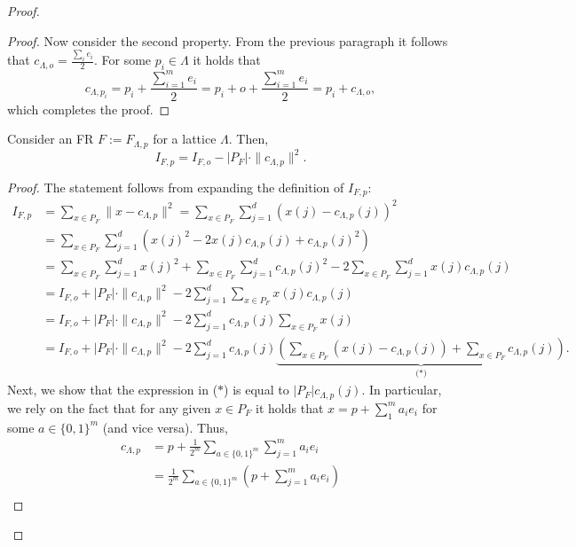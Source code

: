 \begin{proof}
\begin{proof}
    Now consider the second property. From the previous paragraph it follows that $c_{\Lambda,o}=\frac{\sum_ie_i}{2}$. For some $p_i\in \Lambda$ it holds that
    \[c_{\Lambda,p_i}=p_i+\frac{\sum_{i=1}^m e_i}{2}= p_i+o+\frac{\sum_{i=1}^m e_i}{2}=p_i + c_{\Lambda,o},\]
    which completes the proof. 
\end{proof}

\begin{lemma}\label{fr_shifted_sum} Consider an FR $F:=F_{\Lambda,p}$ for a lattice $\Lambda$. Then, 
    \[
        I_{F,p} = I_{F,o} - |P_F|\cdot \|c_{\Lambda,p}\|^2.
    \]
\end{lemma}
\begin{proof}
  The statement follows from expanding the definition of $I_{F,p}$:
    \begin{align}
        I_{F,p} &= \sum_{x\in P_F} \|x-c_{\Lambda,p}\|^2 = \sum_{x\in P_F} \sum_{j=1}^d \left(x(j)-c_{\Lambda,p}(j)\right)^2 \nonumber\\
        &= \sum_{x\in P_F} \sum_{j=1}^d \left(x(j)^2-2x(j)c_{\Lambda,p}(j)+c_{\Lambda,p}(j)^2\right) \nonumber\\
        &=\sum_{x\in P_F} \sum_{j=1}^d x(j)^2 + \sum_{x\in P_F} \sum_{j=1}^d c_{\Lambda,p}(j)^2 - 2\sum_{x\in P_F} \sum_{j=1}^d x(j)c_{\Lambda,p}(j) \nonumber\\
        &= I_{F,o} + |P_F|\cdot\|c_{\Lambda,p}\|^2 - 2 \sum_{j=1}^d \sum_{x\in P_F} x(j)c_{\Lambda,p}(j) \nonumber \\
        &= I_{F,o} + |P_F|\cdot\|c_{\Lambda,p}\|^2 - 2 \sum_{j=1}^d c_{\Lambda,p}(j) \sum_{x\in P_F} x(j) \nonumber \\
        &= I_{F,o} + |P_F|\cdot\|c_{\Lambda,p}\|^2 - 2 \sum_{j=1}^d c_{\Lambda,p}(j) \underbrace{\left(\sum_{x\in P_F} \left(x(j) - c_{\Lambda,p}(j)\right)+\sum_{x\in P_F} c_{\Lambda,p}(j)\right)}_\text{(*)}. \label{eq:IFo}
    \end{align}
    Next, we show that the expression in ($*$) is equal to $|P_F|c_{\Lambda,p}(j)$. In particular, we rely on the fact that for any given $x\in P_F$ it holds that $x=p+\sum_1^m a_ie_i$ for some $a\in\{0,1\}^m$ (and vice versa).
    Thus, 
    \begin{align*}     c_{\Lambda,p}&=p+\frac{1}{2^{m}}\sum_{a\in \{0,1\}^m}\sum_{j=1}^ma_ie_i \\ & =\frac{1}{2^m}\sum_{a\in \{0,1\}^m}\left(p+\sum_{j=1}^m a_ie_i\right)\\

\end{align*}
\end{proof}
\end{proof}
